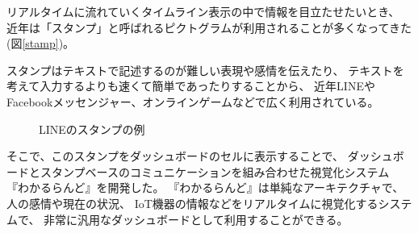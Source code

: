 リアルタイムに流れていくタイムライン表示の中で情報を目立たせたいとき、
近年は「スタンプ」と呼ばれるピクトグラムが利用されることが多くなってきた(図\ref{stamp})。

スタンプはテキストで記述するのが難しい表現や感情を伝えたり、
テキストを考えて入力するよりも速くて簡単であったりすることから、
近年LINEやFacebookメッセンジャー、オンラインゲームなどで広く利用されている。

\begin{figure}[H]
\centering{}
\caption{LINEのスタンプの例}
\label{linestump}
\end{figure}

\vspace{3mm}
そこで、このスタンプをダッシュボードのセルに表示することで、
ダッシュボードとスタンプベースのコミュニケーションを組み合わせた視覚化システム
『わかるらんど』を開発した。
『わかるらんど』は単純なアーキテクチャで、人の感情や現在の状況、
IoT機器の情報などをリアルタイムに視覚化するシステムで、
非常に汎用なダッシュボードとして利用することができる。




